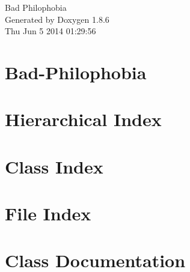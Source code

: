 \documentclass[twoside]{book}
\newcommand{\clearemptydoublepage}{%
  \newpage{\pagestyle{empty}\cleardoublepage}%
}
\begin{document}
\hypersetup{pageanchor=false}
\begin{titlepage}
\vspace*{7cm}
\begin{center}%
{\Large Bad Philophobia }\\
\vspace*{1cm}
{\large Generated by Doxygen 1.8.6}\\
\vspace*{0.5cm}
{\small Thu Jun 5 2014 01:29:56}\\
\end{center}
\end{titlepage}
\clearemptydoublepage
\tableofcontents
\clearemptydoublepage
{}
\hypersetup{pageanchor=true}

\chapter{Bad-\/\-Philophobia}
\label{md_README}
\hypertarget{md_README}{}

\chapter{Hierarchical Index}

\chapter{Class Index}

\chapter{File Index}

\chapter{Class Documentation}

























\end{document}
